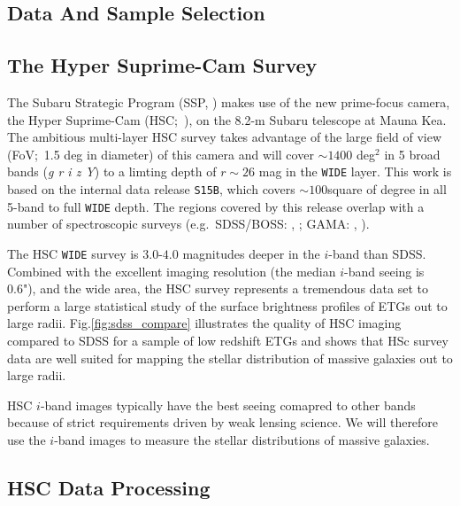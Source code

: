 \documentclass{emulateapj}
\begin{document}
\begin{CJK*}{UTF8}{gbsn}
\section{Data And Sample Selection}
    \label{sec:data}

\subsection{The Hyper Suprime-Cam Survey}
    \label{ssec:hsc}

    The Subaru Strategic Program (SSP, \citealt{MiyazakiInPrep}) makes use of the new 
    prime-focus camera, the Hyper Suprime-Cam (HSC;~\citealt{Miyazaki2012}), on the 
    8.2-m Subaru telescope at Mauna Kea. 
    The ambitious multi-layer HSC survey takes advantage of the large field of 
    view (FoV;~1.5 deg in diameter) of this camera and will cover $\sim 1400$ deg$^2$ in 5
    broad bands (\textit{g r i z Y}) to a limting depth of $r \sim 26$ mag in the \texttt{WIDE} layer. 
    This work is based on the internal data release \texttt{S15B}, which covers 
    $\sim 100$square of degree in all 5-band to full \texttt{WIDE} depth.  
    The regions covered by this release overlap with a number of spectroscopic surveys 
    (e.g.\ SDSS/BOSS: \citealt{Eisenstein2011}, \citealt{Alam2015}; 
    GAMA: \citealt{Driver2011}, \citealt{Liske2015}).

    The HSC \texttt{WIDE} survey is $3.0$-$4.0$ magnitudes deeper in the $i$-band 
    than SDSS. 
    Combined with the excellent imaging resolution (the median $i$-band seeing is 0.6"), 
    and the wide area, the HSC survey represents a tremendous data set to perform a 
    large statistical study of the surface brightness profiles of ETGs out to large radii. Fig.\ref{fig:sdss_compare} illustrates the quality of HSC imaging compared to SDSS 
    for a sample of low redshift ETGs and shows that HSc survey data are well 
    suited for mapping the stellar distribution of massive galaxies out to large radii.

	HSC $i$-band images typically have the best seeing comapred to other bands because of 
    strict requirements driven by weak lensing science. 
    We will therefore use the $i$-band images to measure the stellar distributions of 
    massive galaxies. 
    
\subsection{HSC Data Processing}
    \label{sec:pipeline}
    

\end{CJK*}
\end{document}
